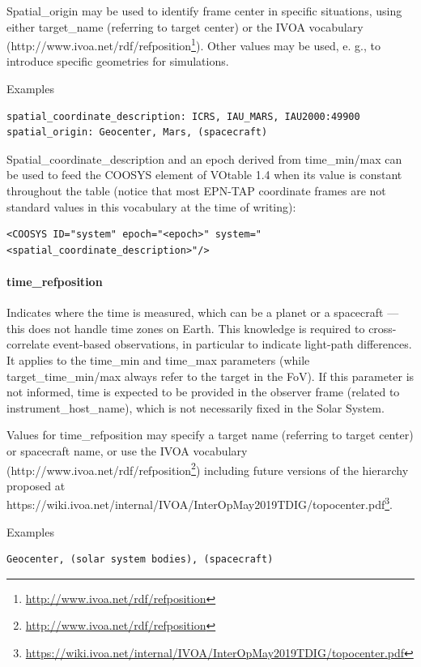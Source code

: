 \documentclass[11pt,a4paper]{ivoa}
\begin{document}
Spatial\_origin may be used to identify frame center in specific situations, using either target\_name (referring to target center) or the IVOA vocabulary (http://www.ivoa.net/rdf/refposition\footnote{\url{http://www.ivoa.net/rdf/refposition}}). Other values may be used, e. g., to introduce specific geometries for simulations.

Examples

\begin{verbatim}
spatial_coordinate_description: ICRS, IAU_MARS, IAU2000:49900
spatial_origin: Geocenter, Mars, (spacecraft)
\end{verbatim}


Spatial\_coordinate\_description and an epoch derived from time\_min/max can be used to feed the COOSYS element of VOtable 1.4 when its value is constant throughout the table (notice that most EPN-TAP coordinate frames are not standard values in this vocabulary at the time of writing):

\begin{verbatim}
<COOSYS ID="system" epoch="<epoch>" system="<spatial_coordinate_description>"/>
\end{verbatim}

\paragraph{time\_refposition}

Indicates where the time is measured, which can be a planet or a spacecraft — this does not handle time zones on Earth. This knowledge is required to cross-correlate event-based observations, in particular to indicate light-path differences. It applies to the time\_min and time\_max parameters (while target\_time\_min/max always refer to the target in the FoV). If this parameter is not informed, time is expected to be provided in the observer frame (related to instrument\_host\_name), which is not necessarily fixed in the Solar System.

Values for time\_refposition may specify a target name (referring to target center) or spacecraft name, or use the IVOA vocabulary (http://www.ivoa.net/rdf/refposition\footnote{\url{http://www.ivoa.net/rdf/refposition}}) including future versions of the hierarchy proposed at https://wiki.ivoa.net/internal/IVOA/InterOpMay2019TDIG/topocenter.pdf\footnote{\url{https://wiki.ivoa.net/internal/IVOA/InterOpMay2019TDIG/topocenter.pdf}}.

Examples

\begin{verbatim}
Geocenter, (solar system bodies), (spacecraft)
\end{verbatim}
\end{document}
